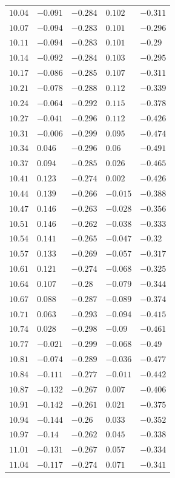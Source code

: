 \begin{center}
\begin{longtable}{lllll}
$10.04$&$-0.091$&$-0.284$&$0.102$&$-0.311$\\
$10.07$&$-0.094$&$-0.283$&$0.101$&$-0.296$\\
$10.11$&$-0.094$&$-0.283$&$0.101$&$-0.29$\\
$10.14$&$-0.092$&$-0.284$&$0.103$&$-0.295$\\
$10.17$&$-0.086$&$-0.285$&$0.107$&$-0.311$\\
$10.21$&$-0.078$&$-0.288$&$0.112$&$-0.339$\\
$10.24$&$-0.064$&$-0.292$&$0.115$&$-0.378$\\
$10.27$&$-0.041$&$-0.296$&$0.112$&$-0.426$\\
$10.31$&$-0.006$&$-0.299$&$0.095$&$-0.474$\\
$10.34$&$0.046$&$-0.296$&$0.06$&$-0.491$\\
$10.37$&$0.094$&$-0.285$&$0.026$&$-0.465$\\
$10.41$&$0.123$&$-0.274$&$0.002$&$-0.426$\\
$10.44$&$0.139$&$-0.266$&$-0.015$&$-0.388$\\
$10.47$&$0.146$&$-0.263$&$-0.028$&$-0.356$\\
$10.51$&$0.146$&$-0.262$&$-0.038$&$-0.333$\\
$10.54$&$0.141$&$-0.265$&$-0.047$&$-0.32$\\
$10.57$&$0.133$&$-0.269$&$-0.057$&$-0.317$\\
$10.61$&$0.121$&$-0.274$&$-0.068$&$-0.325$\\
$10.64$&$0.107$&$-0.28$&$-0.079$&$-0.344$\\
$10.67$&$0.088$&$-0.287$&$-0.089$&$-0.374$\\
$10.71$&$0.063$&$-0.293$&$-0.094$&$-0.415$\\
$10.74$&$0.028$&$-0.298$&$-0.09$&$-0.461$\\
$10.77$&$-0.021$&$-0.299$&$-0.068$&$-0.49$\\
$10.81$&$-0.074$&$-0.289$&$-0.036$&$-0.477$\\
$10.84$&$-0.111$&$-0.277$&$-0.011$&$-0.442$\\
$10.87$&$-0.132$&$-0.267$&$0.007$&$-0.406$\\
$10.91$&$-0.142$&$-0.261$&$0.021$&$-0.375$\\
$10.94$&$-0.144$&$-0.26$&$0.033$&$-0.352$\\
$10.97$&$-0.14$&$-0.262$&$0.045$&$-0.338$\\
$11.01$&$-0.131$&$-0.267$&$0.057$&$-0.334$\\
$11.04$&$-0.117$&$-0.274$&$0.071$&$-0.341$\\

\end{longtable}
\end{center}

